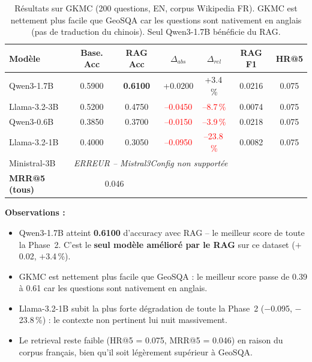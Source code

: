 \documentclass[12pt,a4paper]{article}
\begin{document}
\begin{table}[H]
\centering
\caption{R\'esultats sur GKMC (200 questions, EN, corpus Wikipedia FR). GKMC est nettement
  plus facile que GeoSQA car les questions sont nativement en anglais (pas de traduction
  du chinois). Seul Qwen3-1.7B b\'en\'eficie du RAG.}
\label{tab:gkmc_results}
\begin{tabular}{@{} l c c c c c c @{}}
\toprule
\textbf{Mod\`ele} & \textbf{Base. Acc} & \textbf{RAG Acc}
  & \textbf{$\Delta_{abs}$} & \textbf{$\Delta_{rel}$}
  & \textbf{RAG F1} & \textbf{HR@5} \\
\midrule
Qwen3-1.7B
  & 0.5900 & \textbf{0.6100}
  & \textcolor{green!60!black}{+0.0200} & \textcolor{green!60!black}{+3.4\,\%}
  & 0.0216 & 0.075 \\
\rowcolor{lightgray}
Llama-3.2-3B
  & 0.5200 & 0.4750
  & \textcolor{red}{--0.0450} & \textcolor{red}{--8.7\,\%}
  & 0.0074 & 0.075 \\
Qwen3-0.6B
  & 0.3850 & 0.3700
  & \textcolor{red}{--0.0150} & \textcolor{red}{--3.9\,\%}
  & 0.0218 & 0.075 \\
\rowcolor{lightgray}
Llama-3.2-1B
  & 0.4000 & 0.3050
  & \textcolor{red}{--0.0950} & \textcolor{red}{--23.8\,\%}
  & 0.0082 & 0.075 \\
\midrule
Ministral-3B
  & \multicolumn{6}{l}{\textit{ERREUR -- Mistral3Config non support\'ee}} \\
\midrule
\textbf{MRR@5 (tous)} & \multicolumn{2}{c}{0.046} & & & & \\
\bottomrule
\end{tabular}
\end{table}

\textbf{Observations :}
\begin{itemize}[leftmargin=*]
  \item Qwen3-1.7B atteint \textbf{0.6100} d'accuracy avec RAG -- le meilleur score de
  toute la Phase~2. C'est le \textbf{seul mod\`ele am\'elior\'e par le RAG} sur ce dataset
  ($+$0.02, $+$3.4\,\%).
  \item GKMC est nettement plus facile que GeoSQA : le meilleur score passe de 0.39 \`a
  0.61 car les questions sont nativement en anglais.
  \item Llama-3.2-1B subit la plus forte d\'egradation de toute la Phase~2 ($-$0.095,
  $-$23.8\,\%) : le contexte non pertinent lui nuit massivement.
  \item Le retrieval reste faible (HR@5 = 0.075, MRR@5 = 0.046) en raison du corpus
  fran\c{c}ais, bien qu'il soit l\'eg\`erement sup\'erieur \`a GeoSQA.
\end{itemize}
\end{document}
